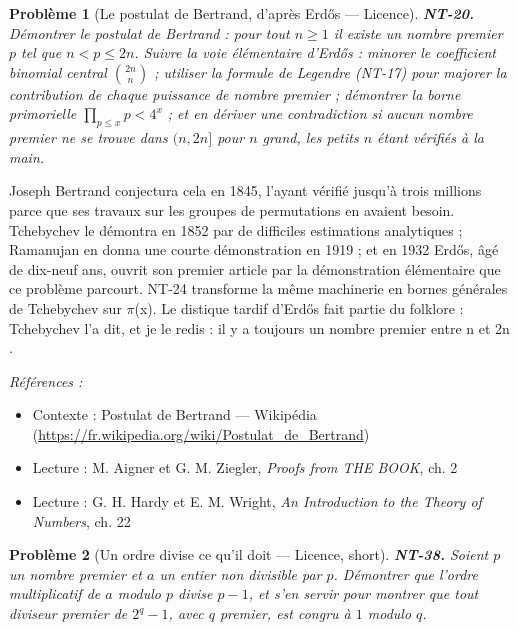\documentclass[11pt]{article}
\newtheorem{problem}{Problème}
\newenvironment{refs}{\par\small\noindent\emph{Références :}\begin{itemize}\setlength\itemsep{0pt}}{\end{itemize}\normalsize}
\begin{document}
\bigskip

\begin{problem}[{Le postulat de Bertrand, d'après Erd\H{o}s --- Licence}]
\textbf{NT-20.} Démontrer le postulat de Bertrand : pour tout $n \ge 1$
il existe un nombre premier $p$ tel que $n < p \le 2n$. Suivre la voie élémentaire d'Erd\H{o}s :
minorer le coefficient binomial central $\binom{2n}{n}$ ; utiliser la formule de Legendre
(NT-17) pour majorer la contribution de chaque puissance de nombre premier ; démontrer la borne
primorielle $\prod_{p \le x} p < 4^x$ ; et en dériver une contradiction si aucun nombre premier
ne se trouve dans $(n, 2n]$ pour $n$ grand, les petits $n$ étant vérifiés à la main.
\end{problem}

\noindent Joseph Bertrand conjectura cela en 1845, l'ayant vérifié jusqu'à trois millions
parce que ses travaux sur les groupes de permutations en avaient besoin. Tchebychev le démontra en
1852 par de difficiles estimations analytiques ; Ramanujan en donna une courte démonstration en
1919 ; et en 1932 Erd\H{o}s, âgé de dix-neuf ans, ouvrit son premier article par la démonstration
élémentaire que ce problème parcourt. NT-24 transforme la même machinerie en bornes générales de
Tchebychev sur $\pi$(x). Le distique tardif d'Erd\H{o}s fait partie du folklore : \og{} Tchebychev l'a dit, et je
le redis : il y a toujours un nombre premier entre n et 2n \fg{}.

\begin{refs}
\item Contexte : Postulat de Bertrand --- Wikipédia (\url{https://fr.wikipedia.org/wiki/Postulat_de_Bertrand})
\item Lecture : M. Aigner et G. M. Ziegler, \textit{Proofs from THE BOOK}, ch. 2
\item Lecture : G. H. Hardy et E. M. Wright, \textit{An Introduction to the Theory of Numbers}, ch. 22
\end{refs}

\bigskip

\begin{problem}[{Un ordre divise ce qu'il doit --- Licence, short}]
\textbf{NT-38.} Soient $ p $ un nombre premier et $ a $ un entier non divisible par $ p $. Démontrer que l'ordre multiplicatif de $ a $ modulo $ p $ divise $ p - 1 $, et s'en servir pour montrer que tout diviseur premier de $ 2^{q} - 1 $, avec $ q $ premier, est congru à $ 1 $ modulo $ q $.
\end{problem}
\end{document}
